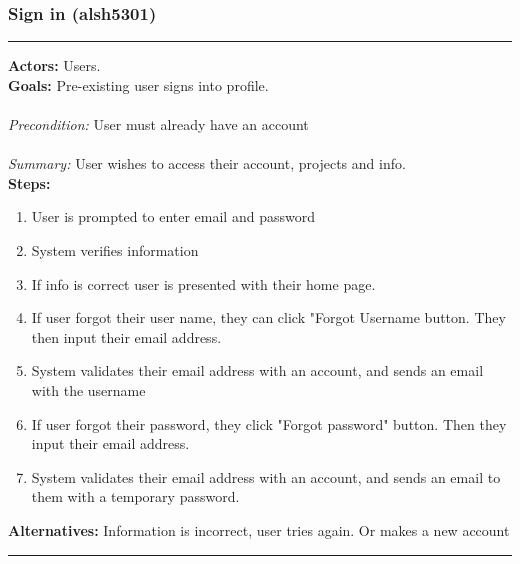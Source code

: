 \documentclass[11pt]{report}
\begin{document}
\subsubsection{Sign in (alsh5301)}
\vspace{2pt}
\hrule
\vspace{8pt}
 \textbf{Actors:} Users. \\ 
 \textbf{Goals:} Pre-existing user signs into profile. \\
 \\
\textit{Precondition:} User must already have an account \\
\\
\textit{Summary:} User wishes to access their account, projects and info. \\
\textbf{Steps:} \begin{enumerate}
  \item User is prompted to enter email and password 
  \item System verifies information
  \item If info is correct user is presented with their home page. 
  \item If user forgot their user name, they can click "Forgot Username button. They then input their email address.
  \item System validates their email address with an account, and sends an email with the username  
  \item If user forgot their password, they click "Forgot password" button. Then they input their email address.
  \item System validates their email address with an account, and sends an email to them with a temporary password.
 \end{enumerate}
 \textbf{Alternatives:} Information is incorrect, user tries again. Or makes a new account \\
 \vspace{8pt}
\hrule
\newpage
\end{document}
